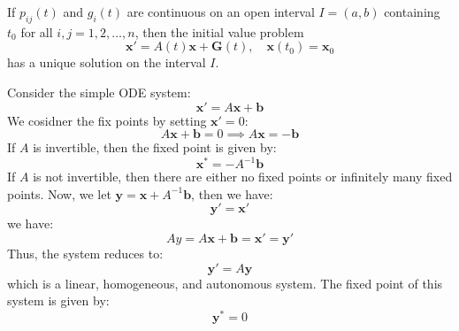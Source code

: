 \documentclass[11pt]{article}
\begin{document}
\begin{theorem}
    If $p_{ij}(t)$ and $g_i(t)$ are continuous on an open interval $I = (a, b)$ containing $t_0$ for all $i, j = 1, 2, \ldots, n$, then the initial value problem
    $$\mathbf{x}' = A(t)\mathbf{x} + \mathbf{G}(t), \quad \mathbf{x}(t_0) = \mathbf{x}_0$$
    has a unique solution on the interval \( I \).
\end{theorem}

\begin{example}
    Consider the simple ODE system:
    $$
        \textbf{x}' = A\textbf{x} +\textbf{b}
    $$
    We cosidner the fix points by setting \( \textbf{x}' = 0 \):
    $$A\textbf{x} + \textbf{b} = 0 \implies A\textbf{x} = -\textbf{b}$$
    If \( A \) is invertible, then the fixed point is given by:
    $$\textbf{x}^* = -A^{-1}\textbf{b}$$
    If \( A \) is not invertible, then there are either no fixed points or infinitely many fixed points. Now, we let $\textbf{y} = \textbf{x} + A^{-1}\textbf{b}$, then we have:
    $$\textbf{y}' =\textbf{x}'$$
    we have:
    $$Ay = A\textbf{x} + \textbf{b} = \textbf{x}' = \textbf{y}'$$
    Thus, the system reduces to:
    $$\textbf{y}' = A\textbf{y}$$
    which is a linear, homogeneous, and autonomous system. The fixed point of this system is given by:
    $$\textbf{y}^* = 0$$
\end{example}
\end{document}
